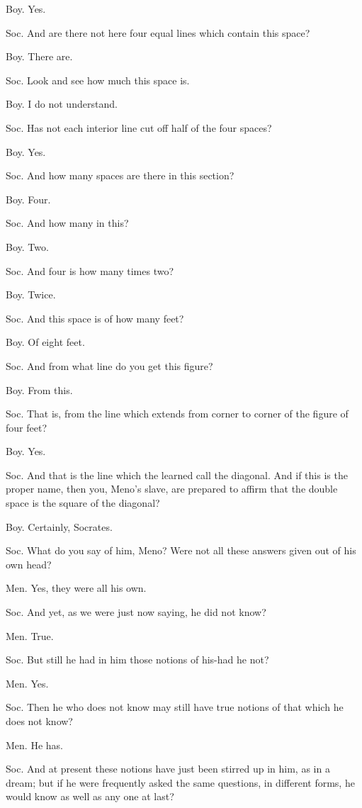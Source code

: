 Boy. Yes. 

Soc. And are there not here four equal lines which contain this space?

Boy. There are. 

Soc. Look and see how much this space is. 

Boy. I do not understand. 

Soc. Has not each interior line cut off half of the four spaces?

Boy. Yes. 

Soc. And how many spaces are there in this section? 

Boy. Four. 

Soc. And how many in this? 

Boy. Two. 

Soc. And four is how many times two? 

Boy. Twice. 

Soc. And this space is of how many feet? 

Boy. Of eight feet. 

Soc. And from what line do you get this figure? 

Boy. From this. 

Soc. That is, from the line which extends from corner to corner of
the figure of four feet? 

Boy. Yes. 

Soc. And that is the line which the learned call the diagonal. And
if this is the proper name, then you, Meno's slave, are prepared to
affirm that the double space is the square of the diagonal?

Boy. Certainly, Socrates. 

Soc. What do you say of him, Meno? Were not all these answers given
out of his own head? 

Men. Yes, they were all his own. 

Soc. And yet, as we were just now saying, he did not know?

Men. True. 

Soc. But still he had in him those notions of his-had he not?

Men. Yes. 

Soc. Then he who does not know may still have true notions of that
which he does not know? 

Men. He has. 

Soc. And at present these notions have just been stirred up in him,
as in a dream; but if he were frequently asked the same questions,
in different forms, he would know as well as any one at last?

